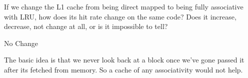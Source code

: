 \begin{blocksection}
\question
If we change the L1 cache from being direct mapped to being fully associative with LRU, how does its hit rate change on the same code? Does it increase, decrease, not change at all, or is it impossible to tell?

\begin{solution}[0.7in]
No Change

The basic idea is that we never look back at a block once we've gone passed it after its fetched from memory. So a cache of any associativity would not help.
\end{solution}

\end{blocksection}